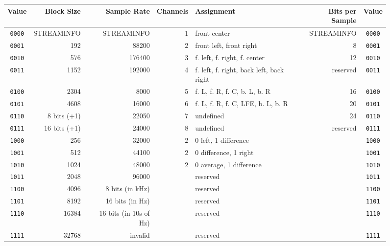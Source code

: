 \label{flac_encoded_fields}
\begin{figure}[h]
\begin{tiny}
\begin{tabular}{|c|r|r|r|l|r|c|}
\hline
Value & Block Size & Sample Rate & Channels & Assignment & Bits per Sample & Value \\
\hline
\texttt{0000} & STREAMINFO & STREAMINFO & 1 & front center & STREAMINFO & \texttt{0000} \\
\texttt{0001} & 192 & 88200 & 2 & front left, front right & 8 & \texttt{0001} \\
\texttt{0010} & 576 & 176400 & 3 & f. left, f. right, f. center & 12 & \texttt{0010} \\
\texttt{0011} & 1152 & 192000 & 4 & f. left, f. right, back left, back right & reserved & \texttt{0011} \\
\texttt{0100} & 2304 & 8000 & 5 & f. L, f. R, f. C, b. L, b. R & 16 & \texttt{0100} \\
\texttt{0101} & 4608 & 16000 & 6 & f. L, f. R, f. C, LFE, b. L, b. R & 20 & \texttt{0101} \\
\texttt{0110} & 8 bits (+1) & 22050 & 7 & undefined & 24 & \texttt{0110} \\
\texttt{0111} & 16 bits (+1) & 24000 & 8 & undefined & reserved & \texttt{0111} \\
\texttt{1000} & 256 & 32000 & 2 & 0 left, 1 difference & & \texttt{1000} \\
\texttt{1001} & 512 & 44100 & 2 & 0 difference, 1 right & & \texttt{1001} \\
\texttt{1010} & 1024 & 48000 & 2 & 0 average, 1 difference & & \texttt{1010} \\
\texttt{1011} & 2048 & 96000 & & reserved & & \texttt{1011} \\
\texttt{1100} & 4096 & 8 bits (in kHz) & & reserved & & \texttt{1100} \\
\texttt{1101} & 8192 & 16 bits (in Hz) & & reserved & & \texttt{1101} \\
\texttt{1110} & 16384 & 16 bits (in 10s of Hz) & & reserved & & \texttt{1110} \\
\texttt{1111} & 32768 & invalid & & reserved & & \texttt{1111} \\
\hline
\end{tabular}
\end{tiny}
\end{figure}
\par
